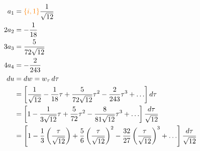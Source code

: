 \documentclass{article}
\begin{document}
\begin{align*}
a_1 & = \textcolor{orange}{\{i, 1\}}\frac{1}{\sqrt{12}} \\
2 a_2 & = -\frac{1}{18} \\
3 a_3 & = \frac{5}{72\sqrt{12}} \\
4 a_4 & = -\frac{2}{243} \\
du & = dw = w_\tau\,d\tau \\
& = \left[ \frac{1}{\sqrt{12}} - \frac{1}{18} \tau + \frac{5}{72\sqrt{12}} \tau^2 - \frac{2}{243} \tau^3 + \ldots \right] d\tau \\
& = \left[ 1 - \frac{1}{3\sqrt{12}} \tau + \frac{5}{72} \tau^2 - \frac{8}{81\sqrt{12}} \tau^3 + \ldots \right] \frac{d\tau}{\sqrt{12}} \\
& = \left[ 1 - \frac{1}{3} \left(\frac{\tau}{\sqrt{12}}\right) + \frac{5}{6} \left(\frac{\tau}{\sqrt{12}}\right)^2 - \frac{32}{27} \left(\frac{\tau}{\sqrt{12}}\right)^3 + \ldots \right] \frac{d\tau}{\sqrt{12}} \\
\end{align*}
\color{black}
\end{document}
